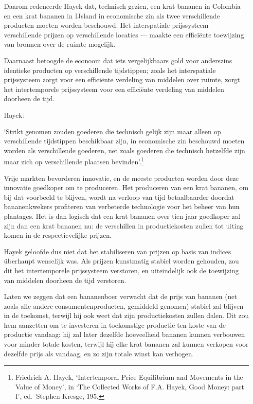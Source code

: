 \documentclass[smalldemyvopaper,11pt,twoside,onecolumn,openright,extrafontsizes,hidelinks]{memoir}
\begin{document}
Daarom redeneerde Hayek dat, technisch gezien, een krat bananen in
Colombia en een krat bananen in IJsland in economische zin als twee
verschillende producten moeten worden beschouwd. Het interspatiale
prijssysteem --- verschillende prijzen op verschillende locaties ---
maakte een efficiënte toewijzing van bronnen over de ruimte mogelijk.

Daarnaast betoogde de econoom dat iets vergelijkbaars gold voor
anderszins identieke producten op verschillende tijdstippen; zoals het
interspatiale prijssysteem zorgt voor een efficiënte verdeling van
middelen over ruimte, zorgt het intertemporele prijssysteem voor een
efficiënte verdeling van middelen doorheen de tijd.

Hayek:

`Strikt genomen zouden goederen die technisch gelijk zijn maar alleen op
verschillende tijdstippen beschikbaar zijn, in economische zin beschouwd
moeten worden als verschillende goederen, net zoals goederen die
technisch hetzelfde zijn maar zich op verschillende plaatsen
bevinden'.\footnote{\hspace{0pt}Friedrich A. Hayek, `Intertemporal Price
  Equilibrium and Movements in the Value of Money', in `The Collected
  Works of F.A. Hayek, Good Money: part I', ed.~Stephen Kresge, 195.}

Vrije markten bevorderen innovatie, en de meeste producten worden door
deze innovatie goedkoper om te produceren. Het produceren van een krat
bananen, om bij dat voorbeeld te blijven, wordt na verloop van tijd
betaalbaarder doordat bananenkwekers profiteren van verbeterde
technologie voor het beheer van hun plantages. Het is dan logisch dat
een krat bananen over tien jaar goedkoper zal zijn dan een krat bananen
nu: de verschillen in productiekosten zullen tot uiting komen in de
respectievelijke prijzen.

Hayek geloofde dus niet dat het stabiliseren van prijzen op basis van
indices überhaupt wenselijk was. Als prijzen kunstmatig stabiel worden
gehouden, zou dit het intertemporele prijssysteem verstoren, en
uiteindelijk ook de toewijzing van middelen doorheen de tijd verstoren.

Laten we zeggen dat een bananenboer verwacht dat de prijs van bananen
(net zoals alle andere consumentenproducten, gemiddeld genomen) stabiel
zal blijven in de toekomst, terwijl hij ook weet dat zijn
productiekosten zullen dalen. Dit zou hem aanzetten om te investeren in
toekomstige productie ten koste van de productie vandaag: hij zal later
dezelfde hoeveelheid bananen kunnen verbouwen voor minder totale kosten,
terwijl hij elke krat bananen zal kunnen verkopen voor dezelfde prijs
als vandaag, en zo zijn totale winst kan verhogen.
\end{document}
